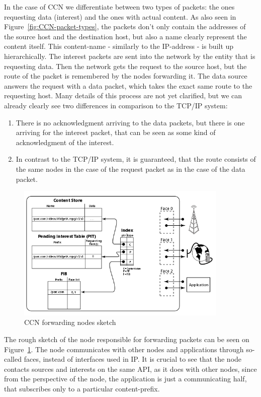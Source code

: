 \documentclass[a4paper]{article}
\begin{document}
In the case of CCN we differentiate between two types of packets: the ones requesting data (interest)
and the ones with actual content. As also seen in Figure~\ref{fig:CCN-packet-types}, the packets don't only contain the 
addresses of the source host and the destination host, but also a name clearly represent the
content itself. This content-name - similarly to the IP-address - is built up hierarchically.
The interest packets are sent into the network by the entity that is requesting data. Then the network 
gets the request to the source host, but the route of the packet is remembered by the nodes 
forwarding it. The data source answers the request with a data packet, which takes the exact 
same route to the requesting host. Many details of this process are not yet clarified, but we
can already clearly see two differences in comparison to the TCP/IP system:
\begin{enumerate}
\item There is no acknowledgment arriving to the data packets, but there is one arriving for the
interest packet, that can be seen as some kind of acknowledgment of the interest.
\item In  contrast to the TCP/IP system, it is guaranteed, that the route consists of the same
nodes in the case of the request packet as in the case of the data packet.
\end{enumerate}

\begin{figure}[H]
    \centering
    \includegraphics[width=0.9\textwidth]{figures/ccn-node.png}
    \caption{CCN forwarding nodes sketch~\cite{CongestionAvoidance}}
    \label{fig:CCN-nodes}
\end{figure}


The rough sketch of the node responsible for forwarding packets can be seen on Figure~\ref{fig:CCN-nodes}. The node
communicates with other nodes and applications through so-called faces, instead of interfaces used
in IP. It is crucial to see that the node contacts sources and interests on the same API, as it does
with other nodes, since from the perspective of the node, the application is just a communicating
half, that subscribes only to a particular content-prefix.
\end{document}
